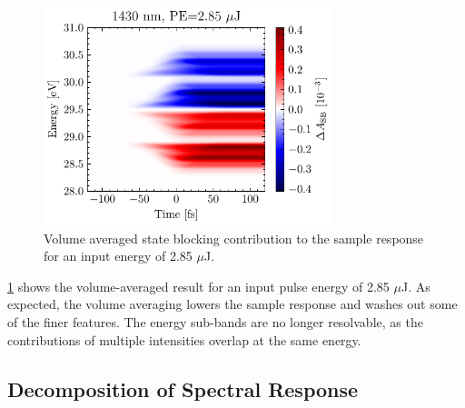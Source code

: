 \begin{figure}
	\centering
	\includegraphics[width=0.75\textwidth]{figures/chap4/dA_SB_calc_1430nm_2.85uJ.pdf}
	\caption{Volume averaged state blocking contribution to the sample response for an input energy of 2.85 $\mu$J.}
	\label{fig:dA_SB_calc_1430nm_2.85uJ}
\end{figure}

\cref{fig:dA_SB_calc_1430nm_2.85uJ} shows the volume-averaged result for an input pulse energy of 2.85 $\mu$J. As expected, the volume averaging lowers the sample response and washes out some of the finer features. The energy sub-bands are no longer resolvable, as the contributions of multiple intensities overlap at the same energy.


\subsection{Decomposition of Spectral Response}

